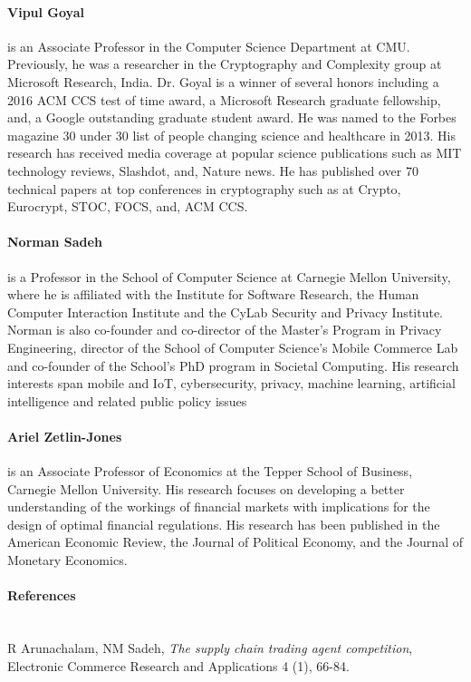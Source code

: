 \documentclass[runningheads, 12pt]{article}
\begin{document}
\vspace{-5pt}
\paragraph{Vipul Goyal} is an Associate Professor in the Computer Science Department at CMU. Previously, he was a researcher in the Cryptography and Complexity group at Microsoft Research, India. Dr. Goyal is a winner of several honors including a 2016 ACM CCS test of time award, a Microsoft Research graduate fellowship, and, a Google outstanding graduate student award. He was named to the Forbes magazine 30 under 30 list of people changing science and healthcare in 2013. His research has received media coverage at popular science publications such as MIT technology reviews, Slashdot, and, Nature news. He has published over 70 technical papers at top conferences in cryptography such as at Crypto, Eurocrypt, STOC, FOCS, and, ACM CCS.

\vspace{-5pt}
\paragraph{Norman Sadeh} is a Professor in the School of Computer Science at Carnegie Mellon University, where he is affiliated with the Institute for Software Research, the Human Computer Interaction Institute and the CyLab Security and Privacy Institute. Norman is also co-founder and co-director of the Master’s Program in Privacy Engineering, director of the School of Computer Science’s Mobile Commerce Lab and co-founder of the School’s PhD program in Societal Computing. His research interests span mobile and IoT, cybersecurity, privacy, machine learning, artificial intelligence and related public policy issues

\vspace{-5pt}
\paragraph{Ariel Zetlin-Jones} is an Associate Professor of Economics at the Tepper School of Business, Carnegie Mellon University. His research focuses on developing a better understanding of the workings of financial markets with implications for the design of optimal financial regulations. His research has been published in the American Economic Review, the Journal of Political Economy, and the Journal of Monetary Economics.

\paragraph{References}~
\\
\vspace{-1pt}
\noindent[AS05] R Arunachalam, NM Sadeh, \emph{The supply chain trading agent competition},  Electronic Commerce Research and Applications 4 (1), 66-84.
\vspace{4pt}
\end{document}
